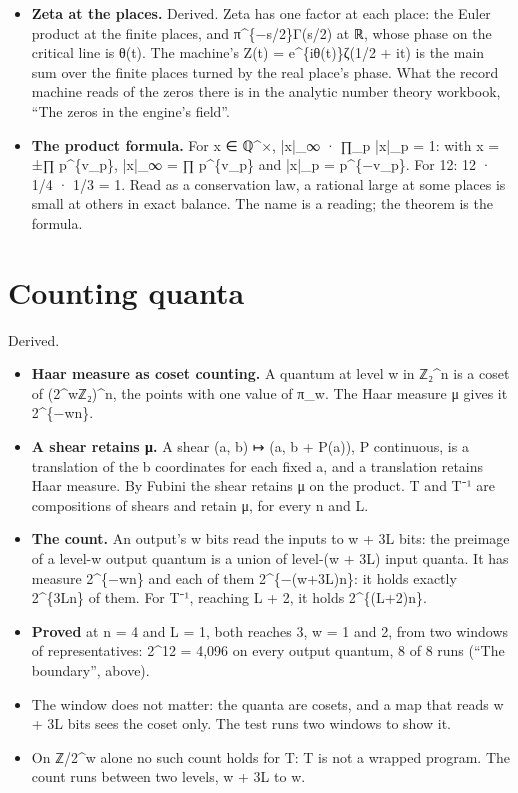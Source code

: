 \begin{itemize}
\item \textbf{Zeta at the places.} Derived. Zeta has one factor at each place: the Euler product at the finite places, and π\textasciicircum{}\{−s/2\}Γ(s/2) at ℝ, whose phase on the critical line is θ(t). The machine's Z(t) = e\textasciicircum{}\{iθ(t)\}ζ(1/2 + it) is the main sum over the finite places turned by the real place's phase. What the record machine reads of the zeros there is in the analytic number theory workbook, “The zeros in the engine's field”.
\item \textbf{The product formula.} For x ∈ ℚ\textasciicircum{}×, |x|\_\allowbreak{}∞ · ∏\_\allowbreak{}p |x|\_\allowbreak{}p = 1: with x = ±∏ p\textasciicircum{}\{v\_\allowbreak{}p\}, |x|\_\allowbreak{}∞ = ∏ p\textasciicircum{}\{v\_\allowbreak{}p\} and |x|\_\allowbreak{}p = p\textasciicircum{}\{−v\_\allowbreak{}p\}. For 12: 12 · 1/4 · 1/3 = 1. Read as a conservation law, a rational large at some places is small at others in exact balance. The name is a reading; the theorem is the formula.
\end{itemize}

\section{\texorpdfstring{Counting quanta}{Counting quanta}}

Derived.

\begin{itemize}
\item \textbf{Haar measure as coset counting.} A quantum at level w in ℤ₂\textasciicircum{}n is a coset of (2\textasciicircum{}wℤ₂)\textasciicircum{}n, the points with one value of π\_\allowbreak{}w. The Haar measure μ gives it 2\textasciicircum{}\{−wn\}.
\item \textbf{A shear retains μ.} A shear (a, b) ↦ (a, b + P(a)), P continuous, is a translation of the b coordinates for each fixed a, and a translation retains Haar measure. By Fubini the shear retains μ on the product. T and T⁻¹ are compositions of shears and retain μ, for every n and L.
\item \textbf{The count.} An output's w bits read the inputs to w + 3L bits: the preimage of a level-w output quantum is a union of level-(w + 3L) input quanta. It has measure 2\textasciicircum{}\{−wn\} and each of them 2\textasciicircum{}\{−(w+3L)n\}: it holds exactly 2\textasciicircum{}\{3Ln\} of them. For T⁻¹, reaching L + 2, it holds 2\textasciicircum{}\{(L+2)n\}.
\item \textbf{Proved} at n = 4 and L = 1, both reaches 3, w = 1 and 2, from two windows of representatives: 2\textasciicircum{}12 = 4,096 on every output quantum, 8 of 8 runs (“The boundary”, above).
\item The window does not matter: the quanta are cosets, and a map that reads w + 3L bits sees the coset only. The test runs two windows to show it.
\item On ℤ/2\textasciicircum{}w alone no such count holds for T: T is not a wrapped program. The count runs between two levels, w + 3L to w.
\end{itemize}


